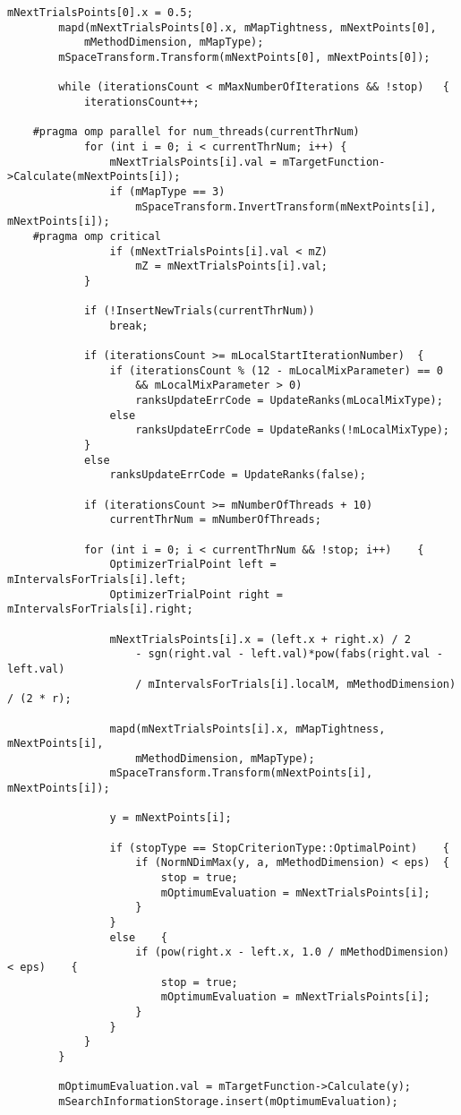 \begin{lstlisting}[frame=single]
		mNextTrialsPoints[0].x = 0.5;
		mapd(mNextTrialsPoints[0].x, mMapTightness, mNextPoints[0],
			mMethodDimension, mMapType);
		mSpaceTransform.Transform(mNextPoints[0], mNextPoints[0]);

		while (iterationsCount < mMaxNumberOfIterations && !stop)	{
			iterationsCount++;

	#pragma omp parallel for num_threads(currentThrNum)
			for (int i = 0; i < currentThrNum; i++)	{
				mNextTrialsPoints[i].val = mTargetFunction->Calculate(mNextPoints[i]);
				if (mMapType == 3)
					mSpaceTransform.InvertTransform(mNextPoints[i], mNextPoints[i]);
	#pragma omp critical
				if (mNextTrialsPoints[i].val < mZ)
					mZ = mNextTrialsPoints[i].val;
			}

			if (!InsertNewTrials(currentThrNum))
				break;

			if (iterationsCount >= mLocalStartIterationNumber)	{
				if (iterationsCount % (12 - mLocalMixParameter) == 0
					&& mLocalMixParameter > 0)
					ranksUpdateErrCode = UpdateRanks(mLocalMixType);
				else
					ranksUpdateErrCode = UpdateRanks(!mLocalMixType);
			}
			else
				ranksUpdateErrCode = UpdateRanks(false);

			if (iterationsCount >= mNumberOfThreads + 10)
				currentThrNum = mNumberOfThreads;

			for (int i = 0; i < currentThrNum && !stop; i++)	{
				OptimizerTrialPoint left = mIntervalsForTrials[i].left;
				OptimizerTrialPoint right = mIntervalsForTrials[i].right;

				mNextTrialsPoints[i].x = (left.x + right.x) / 2
					- sgn(right.val - left.val)*pow(fabs(right.val - left.val)
					/ mIntervalsForTrials[i].localM, mMethodDimension) / (2 * r);

				mapd(mNextTrialsPoints[i].x, mMapTightness, mNextPoints[i],
					mMethodDimension, mMapType);
				mSpaceTransform.Transform(mNextPoints[i], mNextPoints[i]);

				y = mNextPoints[i];

				if (stopType == StopCriterionType::OptimalPoint)	{
					if (NormNDimMax(y, a, mMethodDimension) < eps)	{
						stop = true;
						mOptimumEvaluation = mNextTrialsPoints[i];
					}
				}
				else	{
					if (pow(right.x - left.x, 1.0 / mMethodDimension) < eps)	{
						stop = true;
						mOptimumEvaluation = mNextTrialsPoints[i];
					}
				}
			}
		}

		mOptimumEvaluation.val = mTargetFunction->Calculate(y);
		mSearchInformationStorage.insert(mOptimumEvaluation);


\end{lstlisting}
